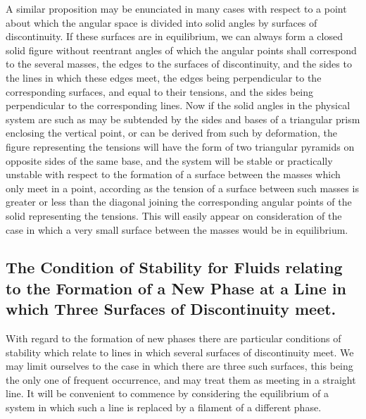 \documentclass[12pt]{memoir}
\begin{document}
A similar proposition may be enunciated in many cases with respect to a point about which the angular space is divided into solid angles by surfaces of discontinuity. If these surfaces are in equilibrium, we can always form  a closed solid figure without reentrant angles of which the angular points shall correspond to the several masses, the edges to the surfaces of discontinuity, and the sides to the lines in which these edges meet, the edges being perpendicular to the corresponding surfaces, and equal to their tensions, and the sides being perpendicular to the corresponding lines. Now if the solid angles in the physical system are such as may be subtended by the sides and bases of a triangular prism enclosing the vertical point, or can be derived from such by deformation, the figure representing the tensions will have the form of two triangular pyramids on opposite sides of the same base, and the system will be stable or practically unstable with respect to the formation of a surface between the masses which only meet in a point, according as the tension of a surface between such masses is greater or less than the diagonal joining the corresponding angular points of the solid representing the tensions. This will easily appear on consideration of the case in which a very small surface between the masses would be in equilibrium.

\subsection{The Condition of Stability for Fluids relating to the Formation of a New Phase at a Line in which Three Surfaces of Discontinuity meet.}
With regard to the formation of new phases there are particular conditions of stability which relate to lines in which several surfaces of discontinuity meet. We may limit ourselves to the case in which there are three such surfaces, this being the only one of frequent occurrence, and may treat them as meeting in a straight line. It will be convenient to commence by considering the equilibrium of a system in which such a line is replaced by a filament of a different phase.
\end{document}
